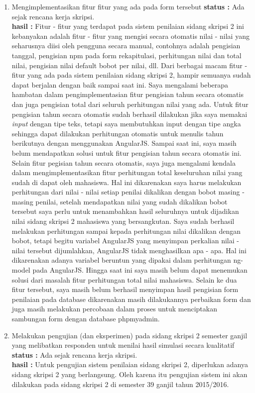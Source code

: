 \documentclass[a4paper,twoside]{article}
\begin{document}
\begin{enumerate}
		\item Mengimplementasikan fitur fitur yang ada pada form tersebut
		{\bf status :} Ada sejak rencana kerja skripsi.\\
		{\bf hasil :} Fitur - fitur yang terdapat pada sistem penilaian sidang skripsi 2 ini kebanyakan adalah fitur - fitur yang mengisi secara otomatis nilai - nilai yang seharusnya diisi oleh pengguna secara manual, contohnya adalah pengisian tanggal, pengisian npm pada form rekapitulasi, perhitungan nilai dan total nilai, pengisian nilai default bobot per nilai, dll. Dari berbagai macam fitur - fitur yang ada pada sistem penilaian sidang skripsi 2, hampir semuanya sudah dapat berjalan dengan baik sampai saat ini. Saya mengalami beberapa hambatan dalam pengimplementasian fitur pengisian tahun secara otomatis dan juga pengisian total dari seluruh perhitungan nilai yang ada. Untuk fitur pengisian tahun secara otomatis sudah berhasil dilakukan jika saya memakai \textit{input} dengan tipe teks, tetapi saya membutuhkan input dengan tipe angka sehingga dapat dilakukan perhitungan otomatis untuk menulis tahun berikutnya dengan menggunakan AngularJS. Sampai saat ini, saya masih belum mendapatkan solusi untuk fitur pengisian tahun secara otomatis ini. Selain fitur pegisian tahun secara otomatis, saya juga mengalami kendala dalam mengimplementasikan fitur perhitungan total keseluruhan nilai yang sudah di dapat oleh mahasiswa. Hal ini dikarenakan saya harus melakukan perhitungan dari nilai - nilai setiap penilai dikalikan dengan bobot masing - masing penilai, setelah mendapatkan nilai yang sudah dikalikan bobot tersebut saya perlu untuk menambahkan hasil seluruhnya untuk dijadikan nilai sidang skripsi 2 mahasiswa yang bersangkutan. Saya sudah berhasil melakukan perhitungan sampai kepada perhitungan nilai dikalikan dengan bobot, tetapi begitu variabel AngularJS yang menyimpan perkalian nilai - nilai tersebut dijumlahkan, AngularJS tidak menghasilkan apa - apa. Hal ini dikarenakan adanya variabel beruntun yang dipakai dalam perhitungan ng-model pada AngularJS. Hingga saat ini saya masih belum dapat menemukan solusi dari masalah fitur perhitungan total nilai mahasiswa. Selain ke dua fitur tersebut, saya masih belum berhasil menyimpan hasil pengisian form penilaian pada database dikarenakan masih dilakukannya perbaikan form dan juga masih melakukan percobaan dalam proses untuk menciptakan sambungan form dengan database phpmyadmin.

		\item Melakukan pengujian (dan eksperimen) pada sidang skripsi 2 semester ganjil yang melibatkan responden untuk menilai hasil simulasi secara kualitatif
		{\bf status :} Ada sejak rencana kerja skripsi.\\
		{\bf hasil :} Untuk pengujian sistem penilaian sidang skripsi 2, diperlukan adanya sidang skripsi 2 yang berlangsung. Oleh karena itu pengujian sistem ini akan dilakukan pada sidang skripsi 2 di semester 39 ganjil tahun 2015/2016.


\end{enumerate}
\end{document}
